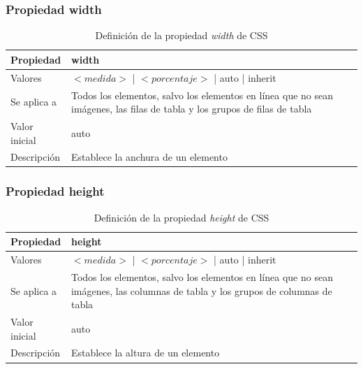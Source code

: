 
\begin{frame}
\frametitle{Propiedad width}

\begin{center}
  \begin{table}
   \begin{tabular}{p{1.8cm}p{7.8cm}}
Propiedad &\bf{width} \\ \hline
Valores & $<medida>$ | $<porcentaje>$ | auto | inherit \\ \hline
Se aplica a & Todos los elementos, salvo los elementos en línea que no sean imágenes, las filas de tabla y los grupos de filas de tabla \\ \hline
Valor inicial & auto \\ \hline
Descripción & Establece la anchura de un elemento \\ \hline
  \end{tabular}
   \caption{Definición de la propiedad \emph{width} de CSS}
 \end{table}
\end{center}

\end{frame}


\begin{frame}
\frametitle{Propiedad height}

\begin{center}
  \begin{table}
   \begin{tabular}{p{1.8cm}p{7.8cm}}
Propiedad &\bf{height} \\ \hline
Valores & $<medida>$ | $<porcentaje>$ | auto | inherit \\ \hline
Se aplica a & Todos los elementos, salvo los elementos en línea que no sean imágenes, las columnas de tabla y los grupos de columnas de tabla \\ \hline
Valor inicial & auto \\ \hline
Descripción & Establece la altura de un elemento \\ \hline
  \end{tabular}
   \caption{Definición de la propiedad \emph{height} de CSS}
 \end{table}
\end{center}

\end{frame}

